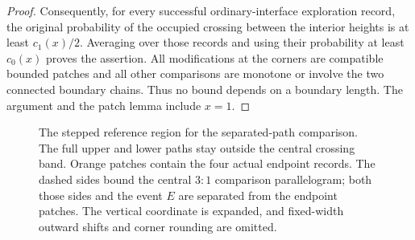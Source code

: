 \begin{proof}
Consequently, for every successful ordinary-interface exploration
record, the original probability of the occupied crossing between the
interior heights is at least $c_1(x)/2$. Averaging over those records
and using their probability at least $c_0(x)$ proves the assertion.
All modifications at the corners are compatible bounded patches and
all other comparisons are monotone or involve the two connected
boundary chains. Thus no bound depends on a boundary length. The
argument and the patch lemma include $x=1$.
\end{proof}

\begin{figure}[tbp]
 \centering
 
 \caption{The stepped reference region for the separated-path comparison.
 The full upper and lower paths stay outside the central crossing band.
 Orange patches contain the four actual endpoint records.  The dashed
 sides bound the central $3:1$ comparison parallelogram; both those
 sides and the event $E$ are separated from the endpoint patches.
 The vertical coordinate is expanded, and fixed-width outward shifts
 and corner rounding are omitted.}
 \label{annulus:fig-stepped}
\end{figure}


